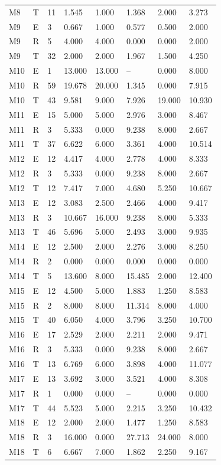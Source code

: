 {\begin{longtable}{llllllll}
M8 & T & 11 & 1.545 & 1.000 & 1.368 & 2.000 & 3.273 \\
M9 & E & 3 & 0.667 & 1.000 & 0.577 & 0.500 & 2.000 \\
M9 & R & 5 & 4.000 & 4.000 & 0.000 & 0.000 & 2.000 \\
M9 & T & 32 & 2.000 & 2.000 & 1.967 & 1.500 & 4.250 \\
M10 & E & 1 & 13.000 & 13.000 & -- & 0.000 & 8.000 \\
M10 & R & 59 & 19.678 & 20.000 & 1.345 & 0.000 & 7.915 \\
M10 & T & 43 & 9.581 & 9.000 & 7.926 & 19.000 & 10.930 \\
M11 & E & 15 & 5.000 & 5.000 & 2.976 & 3.000 & 8.467 \\
M11 & R & 3 & 5.333 & 0.000 & 9.238 & 8.000 & 2.667 \\
M11 & T & 37 & 6.622 & 6.000 & 3.361 & 4.000 & 10.514 \\
M12 & E & 12 & 4.417 & 4.000 & 2.778 & 4.000 & 8.333 \\
M12 & R & 3 & 5.333 & 0.000 & 9.238 & 8.000 & 2.667 \\
M12 & T & 12 & 7.417 & 7.000 & 4.680 & 5.250 & 10.667 \\
M13 & E & 12 & 3.083 & 2.500 & 2.466 & 4.000 & 9.417 \\
M13 & R & 3 & 10.667 & 16.000 & 9.238 & 8.000 & 5.333 \\
M13 & T & 46 & 5.696 & 5.000 & 2.493 & 3.000 & 9.935 \\
M14 & E & 12 & 2.500 & 2.000 & 2.276 & 3.000 & 8.250 \\
M14 & R & 2 & 0.000 & 0.000 & 0.000 & 0.000 & 0.000 \\
M14 & T & 5 & 13.600 & 8.000 & 15.485 & 2.000 & 12.400 \\
M15 & E & 12 & 4.500 & 5.000 & 1.883 & 1.250 & 8.583 \\
M15 & R & 2 & 8.000 & 8.000 & 11.314 & 8.000 & 4.000 \\
M15 & T & 40 & 6.050 & 4.000 & 3.796 & 3.250 & 10.700 \\
M16 & E & 17 & 2.529 & 2.000 & 2.211 & 2.000 & 9.471 \\
M16 & R & 3 & 5.333 & 0.000 & 9.238 & 8.000 & 2.667 \\
M16 & T & 13 & 6.769 & 6.000 & 3.898 & 4.000 & 11.077 \\
M17 & E & 13 & 3.692 & 3.000 & 3.521 & 4.000 & 8.308 \\
M17 & R & 1 & 0.000 & 0.000 & -- & 0.000 & 0.000 \\
M17 & T & 44 & 5.523 & 5.000 & 2.215 & 3.250 & 10.432 \\
M18 & E & 12 & 2.000 & 2.000 & 1.477 & 1.250 & 8.583 \\
M18 & R & 3 & 16.000 & 0.000 & 27.713 & 24.000 & 8.000 \\
M18 & T & 6 & 6.667 & 7.000 & 1.862 & 2.250 & 9.167 \\
\end{longtable}}

